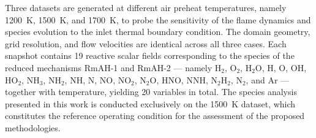 Three datasets are generated at different air preheat temperatures, namely 1200~K, 1500~K, and 1700~K, to probe the sensitivity of the flame dynamics and species evolution to the inlet thermal boundary condition. The domain geometry, grid resolution, and flow velocities are identical across all three cases. Each snapshot contains 19 reactive scalar fields corresponding to the species of the reduced mechanisms RmAH-1 and RmAH-2 \cite{grassi2025} — namely H$_2$, O$_2$, H$_2$O, H, O, OH, HO$_2$, NH$_3$, NH$_2$, NH, N, NO, NO$_2$, N$_2$O, HNO, NNH, N$_2$H$_2$, N$_2$, and Ar — together with temperature, yielding 20 variables in total. The species analysis presented in this work is conducted exclusively on the 1500~K dataset, which constitutes the reference operating condition for the assessment of the proposed methodologies.

